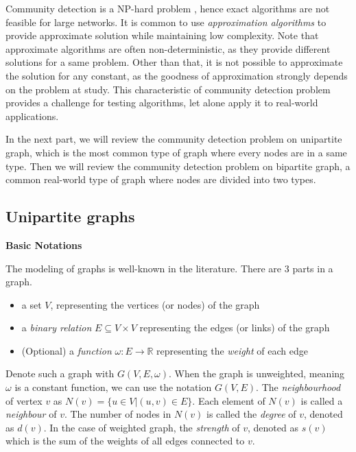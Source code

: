 Community detection is a NP-hard problem \parencite{fortunato2010},
hence exact algorithms are not feasible for large networks.
It is common to use \textit{approximation algorithms} to provide approximate solution while maintaining low complexity.
Note that approximate algorithms are often non-deterministic, as they provide different solutions for a same problem.
Other than that, it is not possible to approximate the solution for any constant,
as the goodness of approximation strongly depends on the problem at study.
This characteristic of community detection problem provides a challenge for
testing algorithms, let alone apply it to real-world applications.

In the next part, we will review the community detection problem on unipartite graph,
which is the most common type of graph where every nodes are in a same type.
Then we will review the community detection problem on bipartite graph,
a common real-world type of graph where nodes are divided into two types.

\subsection{Unipartite graphs}

\textbf{Basic Notations}

The modeling of graphs is well-known in the literature.
There are 3 parts in a graph.

\begin{itemize}
	\item a set $V$, representing the vertices (or nodes) of the graph
	\item a \textit{binary relation} $E\subseteq V \times V$ representing the edges (or links) of the graph
	\item (Optional) a \textit{function} $\omega: E \rightarrow \mathbb{R}$ representing the \textit{weight} of each edge
\end{itemize}

Denote such a graph with $G(V, E, \omega)$.
When the graph is unweighted, meaning $\omega$ is a constant function, we can use the notation $G(V, E)$.
The \textit{neighbourhood} of vertex $v$ as $N(v) = \{u \in V | (u, v) \in E\}$.
Each element of $N(v)$ is called a \textit{neighbour} of $v$.
The number of nodes in $N(v)$ is called the \textit{degree} of $v$, denoted as $d(v)$.
In the case of weighted graph, the \textit{strength} of $v$, denoted as $s(v)$
which is the sum of the weights of all edges connected to $v$.

